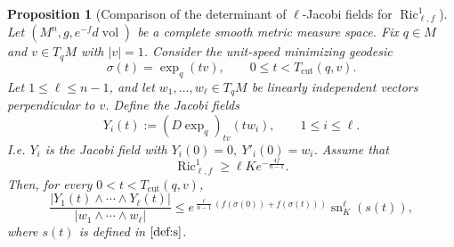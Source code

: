 \documentclass[psamsfonts]{amsart}
\newtheorem{prop}[thm]{Proposition}
\theoremstyle{definition}
\theoremstyle{remark}
\numberwithin{equation}{section}
\begin{document}
\begin{prop}[Comparison of the determinant of $\ell$-Jacobi fields for $\operatorname{Ric}^{1}_{\ell,f}$]
    \label{lem:weighted-bishop-jacobi}
Let $(M^n,g,e^{-f}d\operatorname{vol})$ be a complete smooth metric measure space.
Fix $q \in M$ and $v \in T_qM$ with $|v| =1$. Consider the unit-speed minimizing geodesic
$$
    \sigma(t)=\exp_q(tv),\qquad 0 \leq t < T_{\mathrm{cut}}(q,v).
$$
Let $1\leq \ell\leq n-1$, and let
$w_1,\ldots,w_\ell\in T_qM$ be linearly independent vectors perpendicular to $v$.
Define the Jacobi fields
$$
    Y_i(t):=(D\exp_q)_{tv}(t w_i),\qquad 1\leq i\leq \ell .
$$
I.e. $Y_i$ is the Jacobi field with $Y_i(0) =0, \ Y'_i(0) = w_i$. 
Assume that
$$
    \operatorname{Ric}^{1}_{\ell,f}
    \geq
    \ell K e^{-\frac{4f}{n-1}}.
$$
Then, for every $0<t< T_{\mathrm{cut}}(q,v)$,
$$
\frac{|Y_1(t)\wedge\cdots\wedge Y_\ell(t)|}
{|w_1\wedge\cdots\wedge w_\ell|}
\leq
e^{\frac{\ell}{n-1}\left(f(\sigma(0))+f(\sigma(t))\right)}
\operatorname{sn}_K^\ell(s(t)) ,
$$
where $s(t)$ is defined in $\eqref{def:s}$.
\end{prop}
\end{document}
